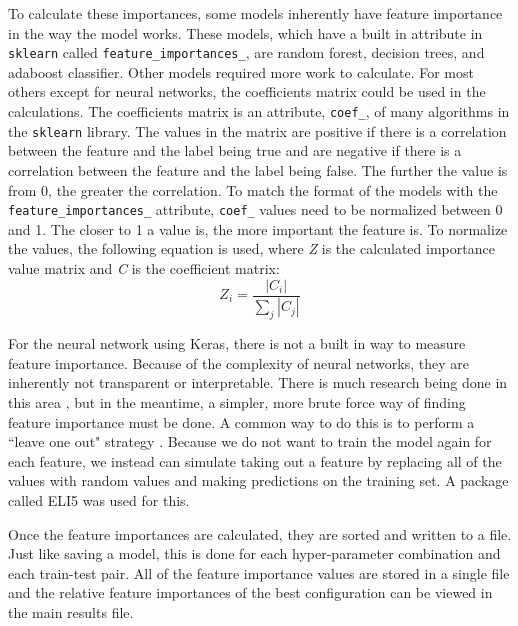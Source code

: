 To calculate these importances, some models inherently have feature importance in the way the model works. These models, which have a built in attribute in {\tt sklearn} called {\tt feature\_importances\_}, are random forest, decision trees, and adaboost classifier. Other models required more work to calculate. For most others except for neural networks, the coefficients matrix could be used in the calculations. The coefficients matrix is an attribute, {\tt coef\_}, of many algorithms in the {\tt sklearn} library. The values in the matrix are positive if there is a correlation between the feature and the label being true and are negative if there is a correlation between the feature and the label being false. The further the value is from 0, the greater the correlation. To match the format of the models with the {\tt feature\_importances\_} attribute, {\tt coef\_} values need to be normalized between 0 and 1. The closer to 1 a value is, the more important the feature is. To normalize the values, the following equation is used, where \textit{Z} is the calculated importance value matrix and \textit{C} is the coefficient matrix: \[Z_i = \frac{|C_i| }{\sum_{j}|C_j|}\]

For the neural network using Keras, there is not a built in way to measure feature importance. Because of the complexity of neural networks, they are inherently not transparent or interpretable. There is much research being done in this area \parencite{Interpretable}, but in the meantime, a simpler, more brute force way of finding feature importance must be done. A common way to do this is to perform a ``leave one out" strategy \parencite{leaveoneout}. Because we do not want to train the model again for each feature, we instead can simulate taking out a feature by replacing all of the values with random values and making predictions on the training set. A package called ELI5 \parencite{eli5} was used for this. 

Once the feature importances are calculated, they are sorted and written to a file. Just like saving a model, this is done for each hyper-parameter combination and each train-test pair. All of the feature importance values are stored in a single file and the relative feature importances of the best configuration can be viewed in the main results file.

